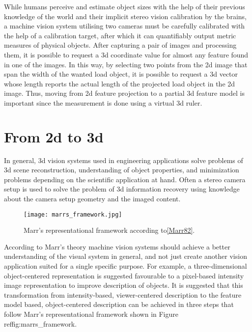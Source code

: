 \documentclass[12pt,a4paper,oneside,pdftex]{report}
\begin{document}
{While humans perceive and estimate object sizes with the help of their previous knowledge of the world and their implicit stereo vision calibration by the brains, a machine vision system utilising two cameras must be carefully calibrated with the help of a calibration target, after which it can quantifiably output metric measures of physical objects. After capturing a pair of images and processing them, it is possible to request a 3d coordinate value for almost any feature found in one of the images. In this way, by selecting two points from the 2d image that span the width of the wanted load object, it is possible to request a 3d vector whose length reports the actual length of the projected load object in the 2d image. Thus, moving from 2d feature projection to a partial 3d feature model is important since the measurement is done using a virtual 3d ruler.

\section{From 2d to 3d}
\label{section:from_2d_to_3d}

In general, 3d vision systems used in engineering applications solve problems of 3d scene reconstruction, understanding of object properties, and minimization problems depending on the scientific application at hand. Often a stereo camera setup is used to solve the problem of 3d information recovery using knowledge about the camera setup geometry and the imaged content\cite{Sonka07}.

\begin{figure}[ht]
  \begin{center}
    \texttt{[image: marrs\_framework.jpg]}
    \caption{Marr's representational framework according to\ref{Marr82}.}
    \label{fig:marrs_framework}
  \end{center}
\end{figure}

According to Marr's theory machine vision systems should achieve a better understanding of the visual system in general, and not just create another vision application suited for a single specific purpose. For example, a three-dimensional object-centered representation is suggested favourable to a pixel-based intensity image representation to improve description of objects. It is suggested that this transformation from intensity-based, viewer-centered description to the feature model based, object-centered description can be achieved in three steps that follow Marr's representational framework shown in Figure ref{fig:marrs_framework}.

}
\end{document}
